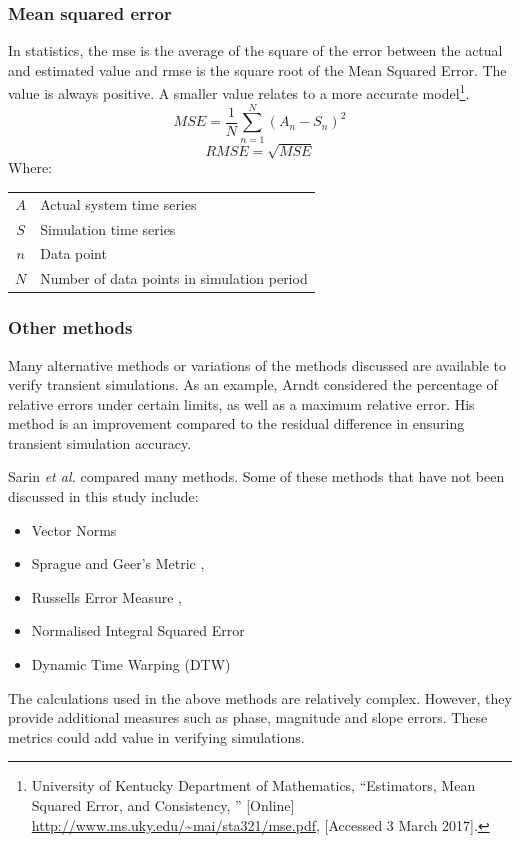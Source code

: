  		\subsubsection{Mean squared error}	
 		In statistics, the \gls{mse} is the average of the square of the error between the actual and estimated value and \gls{rmse} is the square root of the Mean Squared Error. The value is always positive. A smaller value relates to a more accurate model\footnote{University of Kentucky Department of Mathematics, \enquote{Estimators, Mean Squared Error, and
 			Consistency, } [Online] \url{http://www.ms.uky.edu/~mai/sta321/mse.pdf}, [Accessed 3 March 2017].}.
 			\begin{equation}
 				\label{eq: mse}
 				MSE = \dfrac{1}{N}\sum_{n=1}^{N}{(A_{n} - S_{n})^2}
 			\end{equation}
 			\begin{equation}
 			\label{eq: rmse}
 			RMSE = \sqrt{MSE}
 			\end{equation}
 			Where: \par
 			\begin{table}[!htbp]
 				\centering
 				\begin{tabular}{cl}
 					$A$ & Actual system time series \\
 					$S$ & Simulation time series \\
 					$n$ & Data point \\
 					$N$ & Number of data points in simulation period \\
 			\end{tabular} 
 			\end{table}			
 		\subsubsection{Other methods}
 		Many alternative methods or variations of the methods discussed are available to verify transient simulations. As an example, Arndt \cite{arndt2007integrated} considered the percentage of relative errors under certain limits, as well as a maximum relative error. His method is an improvement compared to the residual difference in ensuring transient simulation accuracy.
 		\par
 		Sarin \textit{et al.} \cite{sarin2010comparing} compared many methods. Some of these methods that have not been discussed in this study include:
 		\begin{itemize}
 			\item Vector Norms
 			\item Sprague and Geer's Metric \cite{Geers1984Objective}, \cite{Sprague2004Spectral}
 			\item Russells Error Measure \cite{Russell1}, \cite{Russell2}
 			\item Normalised Integral Squared Error
 			\item Dynamic Time Warping (DTW)
 		\end{itemize}
 		The calculations used in the above methods are relatively complex. However, they provide additional measures such as phase, magnitude and slope errors. These metrics could add value in verifying simulations.
